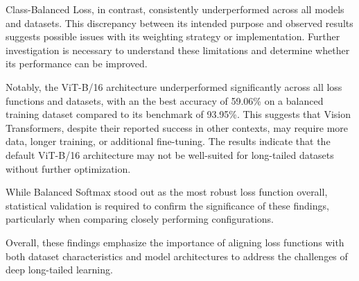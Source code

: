 Class-Balanced Loss, in contrast, consistently underperformed across all models and datasets. This discrepancy between its intended purpose and observed results suggests possible issues with its weighting strategy or implementation. Further investigation is necessary to understand these limitations and determine whether its performance can be improved.

Notably, the ViT-B/16 architecture underperformed significantly across all loss functions and datasets, with an the best accuracy of 59.06\% on a balanced training dataset compared to its benchmark of 93.95\%. This suggests that Vision Transformers, despite their reported success in other contexts, may require more data, longer training, or additional fine-tuning. The results indicate that the default ViT-B/16 architecture may not be well-suited for long-tailed datasets without further optimization.

While Balanced Softmax stood out as the most robust loss function overall, statistical validation is required to confirm the significance of these findings, particularly when comparing closely performing configurations. %

Overall, these findings emphasize the importance of aligning loss functions with both dataset characteristics and model architectures to address the challenges of deep long-tailed learning. %